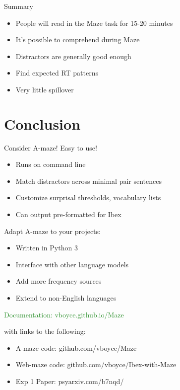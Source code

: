 \documentclass[ 12pt, xcolor=beamer,table,usenames,dvipsnames, ignorenonframetext, ngerman]{beamer}
\begin{document}
\begin{frame}{Summary}
	\begin{itemize}\pause
		\item People will read in the Maze task for 15-20 minutes \pause
		\item It's possible to comprehend during Maze \pause
		\item Distractors are generally good enough \pause
		\item Find expected RT patterns \pause
		\item Very little spillover
	\end{itemize}
\end{frame}

\section{Conclusion}

\begin{frame}{Consider A-maze!}
Easy to use! \pause
\begin{itemize}
	\item Runs on command line \pause
	\item Match distractors across minimal pair sentences \pause
	\item Customize surprisal thresholds, vocabulary lists \pause
	\item Can output pre-formatted for Ibex\pause
\end{itemize}

Adapt A-maze to your projects:
\begin{itemize}
	\item Written in Python 3 
	\item Interface with other language models 
	\item Add more frequency sources 
	\item Extend to non-English languages
\end{itemize}
\medskip
\end{frame}


\begin{frame}{}

\textcolor{ForestGreen}{\large Documentation: vboyce.github.io/Maze}

with links to the following:
\begin{itemize}

\item A-maze code: github.com/vboyce/Maze

\item Web-maze code: github.com/vboyce/Ibex-with-Maze

\item Exp 1 Paper: psyarxiv.com/b7nqd/
\end{itemize}
\end{frame}
\end{document}
